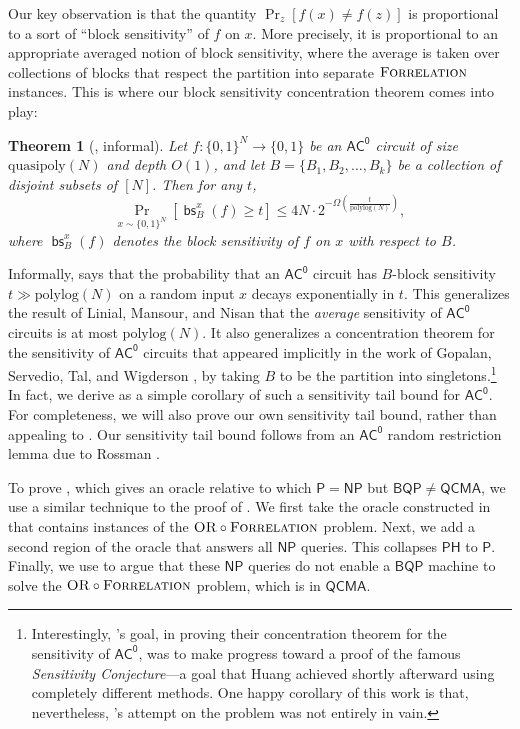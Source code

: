 \documentclass[11pt]{article}%
\newtheorem{theorem}{Theorem}
\newcommand{\polylog}{\mathrm{polylog}}
\newcommand{\quasipoly}{\mathrm{quasipoly}}
\newcommand{\OR}{\normalfont\textsc{OR}}
\newcommand{\Forrelation}{\normalfont\textsc{Forrelation}}
\DeclareMathOperator{\bs}{\mathsf{bs}}
\begin{document}
Our key observation is that the quantity $\Pr_{z}[f(x) \neq f(z)]$ is proportional to a sort of ``block sensitivity'' of $f$ on $x$. More precisely, it is proportional to an appropriate averaged notion of block sensitivity, where the average is taken over collections of blocks that respect the partition into separate $\Forrelation$ instances. This is where our block sensitivity concentration theorem comes into play:

\begin{theorem}[, informal]
\label{thm:ac0_block_sensitivity_intro}
Let $f: \{0,1\}^N \to \{0,1\}$ be an $\mathsf{AC^0}$ circuit of size $\quasipoly(N)$ and depth $O(1)$, and let $B = \{B_1,B_2,\ldots,B_k\}$ be a collection of disjoint subsets of $[N]$. Then for any $t$,
\[
\Pr_{x \sim \{0,1\}^N} \left[ \bs_B^x(f) \ge t \right] \le 4N\cdot 2^{-\Omega\left(\frac{t}{\polylog(N)}\right)},
\]
where $\bs_B^x(f)$ denotes the block sensitivity of $f$ on $x$ with respect to $B$.
\end{theorem}

Informally,  says that the probability that an $\mathsf{AC^0}$ circuit has $B$-block sensitivity $t \gg \polylog(N)$ on a random input $x$ decays exponentially in $t$. This generalizes the result of Linial, Mansour, and Nisan \cite{LMN93} that the \textit{average} sensitivity of $\mathsf{AC^0}$ circuits is at most $\polylog(N)$. It also generalizes a concentration theorem for the sensitivity of $\mathsf{AC^0}$ circuits that appeared implicitly in the work of Gopalan, Servedio, Tal, and Wigderson \cite{GSTW16}, by taking $B$ to be the partition into singletons.\footnote{Interestingly, \cite{GSTW16}'s goal, in proving their concentration theorem for the sensitivity of $\mathsf{AC^0}$, was to make progress toward a proof of the famous \textit{Sensitivity Conjecture}---a goal that Huang \cite{Hua19} achieved shortly afterward using completely different methods.  One happy corollary of this work is that, nevertheless, \cite{GSTW16}'s attempt on the problem was not entirely in vain.} In fact, we derive  as a simple corollary of such a sensitivity tail bound for $\mathsf{AC^0}$. For completeness, we will also prove our own sensitivity tail bound, rather than appealing to \cite{GSTW16}. Our sensitivity tail bound follows from an $\mathsf{AC^0}$ random restriction lemma due to Rossman \cite{Ros17}.

\bigskip

To prove , which gives an oracle relative to which $\mathsf{P} = \mathsf{NP}$ but $\mathsf{BQP} \neq \mathsf{QCMA}$, we use a similar technique to the proof of . We first take the oracle constructed in  that contains instances of the $\OR \circ \Forrelation$ problem. Next, we add a second region of the oracle that answers all $\mathsf{NP}$ queries. This collapses $\mathsf{PH}$ to $\mathsf{P}$. Finally, we use  to argue that these $\mathsf{NP}$ queries do not enable a $\mathsf{BQP}$ machine to solve the $\OR \circ \Forrelation$ problem, which is in $\mathsf{QCMA}$.
\end{document}
